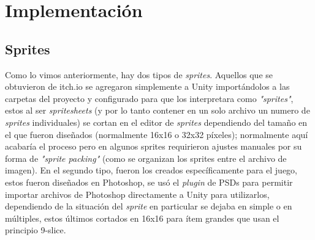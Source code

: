 \section{Implementación}
\subsection{Sprites}
Como lo vimos anteriormente, hay dos tipos de \textit{sprites}. Aquellos que se obtuvieron de itch.io se agregaron simplemente a Unity importándolos a las carpetas del proyecto y configurado para que los interpretara como \textit{"sprites"}, estos al ser \textit{spritesheets} (y por lo tanto contener en un solo archivo un numero de \textit{sprites} individuales) se cortan en el editor de \textit{sprites} dependiendo del tamaño en el que fueron diseñados (normalmente 16x16 o 32x32 píxeles); normalmente aquí acabaría el proceso pero en algunos sprites requirieron ajustes manuales por su forma de \textit{"sprite packing"} (como se organizan los sprites entre el archivo de imagen). En el segundo tipo, fueron los creados específicamente para el juego, estos fueron diseñados en Photoshop, se usó el \textit{plugin} de PSDs para permitir importar archivos de Photoshop directamente a Unity para utilizarlos, dependiendo de la situación del \textit{sprite} en particular se dejaba en simple o en múltiples, estos últimos cortados en  16x16 para ítem grandes que usan el principio 9-slice.

